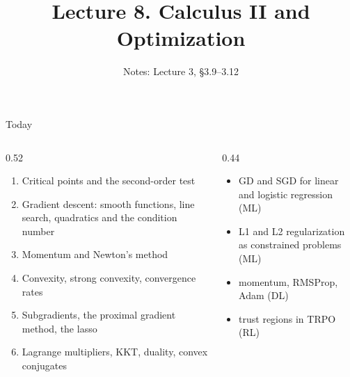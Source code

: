 \documentclass[aspectratio=1610,11pt]{beamer}
\title[Lecture 8 · Calculus II and Optimization]{Lecture 8. Calculus II and Optimization}
\subtitle{Notes: Lecture 3, \S3.9--3.12}
\begin{document}
\begin{frame}[plain]
    \titlepage
\end{frame}

\begin{frame}{Today}
    \begin{columns}[T]
        \begin{column}{0.52\linewidth}
            \begin{enumerate}\small
                \item Critical points and the second-order test
                \item Gradient descent: smooth functions, line search, quadratics and the condition number
                \item Momentum and Newton's method
                \item Convexity, strong convexity, convergence rates
                \item Subgradients, the proximal gradient method, the lasso
                \item Lagrange multipliers, KKT, duality, convex conjugates
            \end{enumerate}
        \end{column}
        \begin{column}{0.44\linewidth}
            \begin{mlbox}[Used in]
                \small
                \begin{itemize}
                    \item GD and SGD for linear and logistic regression (ML)
                    \item L1 and L2 regularization as constrained problems (ML)
                    \item momentum, RMSProp, Adam (DL)
                    \item trust regions in TRPO (RL)
                \end{itemize}
            \end{mlbox}
        \end{column}
    \end{columns}
\end{frame}

\end{document}
